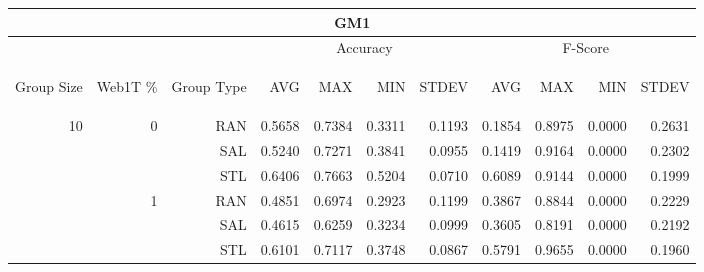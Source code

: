 \begin{center}
\begin{table}[htbp]
\begin{tabular}{ | r | r | r | r | r | r | r | r | r | r | r |}
\hline
\multicolumn{11}{|c|}{GM1}\\
\hline
 & & & \multicolumn{4}{|c|}{Accuracy} & \multicolumn{4}{|c|}{F-Score}\\ \cline{4-11}
\begin{sideways}Group Size\end{sideways} & \begin{sideways}Web1T \%\end{sideways} & \begin{sideways}Group Type\end{sideways} & \begin{sideways}AVG\end{sideways} & \begin{sideways}MAX\end{sideways} & \begin{sideways}MIN\end{sideways} & \begin{sideways}STDEV\end{sideways} & \begin{sideways}AVG\end{sideways} & \begin{sideways}MAX\end{sideways} & \begin{sideways}MIN\end{sideways} & \begin{sideways}STDEV\end{sideways}\\
\hline
\multirow{18}{*}{10}
 & \multirow{3}{*}{0} & RAN & 0.5658 & 0.7384 & 0.3311 & 0.1193 & 0.1854 & 0.8975 & 0.0000 & 0.2631\\ \cline{3-11}
 &   & SAL & 0.5240 & 0.7271 & 0.3841 & 0.0955 & 0.1419 & 0.9164 & 0.0000 & 0.2302\\ \cline{3-11}
 &   & STL & 0.6406 & 0.7663 & 0.5204 & 0.0710 & 0.6089 & 0.9144 & 0.0000 & 0.1999\\ \cline{2-11}
 & \multirow{3}{*}{1} & RAN & 0.4851 & 0.6974 & 0.2923 & 0.1199 & 0.3867 & 0.8844 & 0.0000 & 0.2229\\ \cline{3-11}
 &   & SAL & 0.4615 & 0.6259 & 0.3234 & 0.0999 & 0.3605 & 0.8191 & 0.0000 & 0.2192\\ \cline{3-11}
 &   & STL & 0.6101 & 0.7117 & 0.3748 & 0.0867 & 0.5791 & 0.9655 & 0.0000 & 0.1960\\ \cline{2-11}

\end{tabular}
\end{table}
\end{center}
